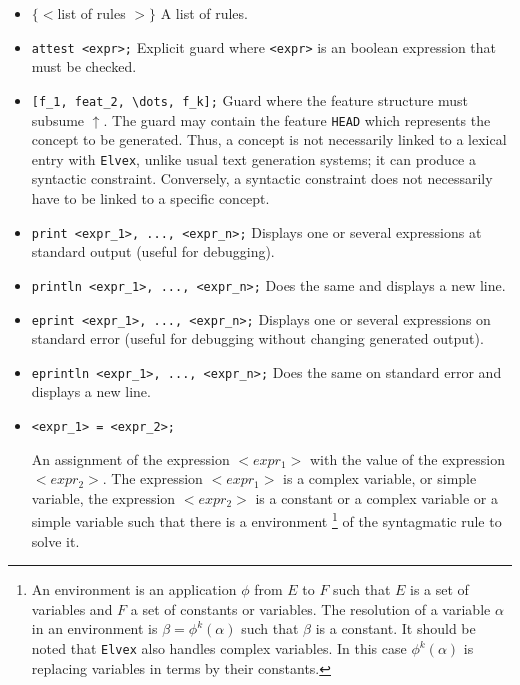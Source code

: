 \documentclass[11pt]{article}
\begin{document}
\begin{itemize}

	\item $\{<$list of rules $>\}$ A list of rules.

	\item \verb#attest <expr>;# Explicit guard where \verb#<expr># is an
	      boolean expression that must be checked.

	\item \verb#[f_1, feat_2, \dots, f_k];# Guard where the feature
	      structure must subsume $\uparrow$. The guard may contain the feature
	      \verb#HEAD# which represents the concept to be generated. Thus, a
	      concept is not necessarily linked to a lexical entry with
	      \texttt{Elvex}, unlike usual text generation systems;
	      it can produce a syntactic constraint. Conversely, a syntactic constraint
	      does not necessarily have to be linked to a specific concept.

	\item \verb#print <expr_1>, ..., <expr_n>;# Displays one or several
	      expressions at standard output (useful for debugging).

	\item \verb#println <expr_1>, ..., <expr_n>;# Does the same and displays a
	      new line.

	\item \verb#eprint <expr_1>, ..., <expr_n>;# Displays one or several
	      expressions on standard error (useful for debugging without changing
	      generated output).

	\item \verb#eprintln <expr_1>, ..., <expr_n>;# Does the same on standard
	      error and displays a new line.

	\item  \verb#<expr_1> = <expr_2>;#

	      An assignment of the expression $<expr_1>$ with the value of the
	      expression $<expr_2>$. The expression $<expr_1>$ is a complex
	      variable, or simple variable, the expression $<expr_2>$ is a constant
	      or a complex variable or a simple variable such that there is a
	      environment \footnote{An environment is an application $\phi$ from
		      $E$ to $F$ such that $E$ is a set of variables and $F$ a set of
		      constants or variables. The resolution of a variable $\alpha$ in
		      an environment is $\beta = \phi^k(\alpha)$ such that $\beta$ is a
		      constant. It should be noted that \texttt{Elvex} also handles
		      complex variables. In this case $\phi^k(\alpha)$ is replacing
		      variables in terms by their constants. } of the syntagmatic rule
	      to solve it.


\end{itemize}
\end{document}
